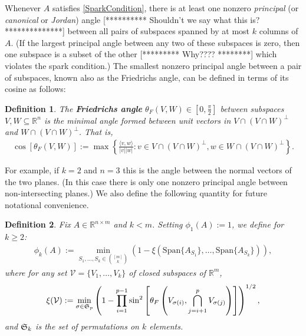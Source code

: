 \documentclass[journal, onecolumn]{IEEEtran}
\newtheorem{definition}{Definition}
\begin{document}
Whenever $A$ satisfies \eqref{SparkCondition}, there is at least one nonzero \textit{principal} (or \textit{canonical} or \textit{Jordan}) angle [********** Shouldn't we say what this is? **************] between all pairs of subspaces spanned by at most $k$ columns of $A$. (If the largest principal angle between any two of these subspaces is zero, then one subspace is a subset of the other [*********  Why???? ********] which violates the spark condition.) The smallest nonzero principal angle between a pair of subspaces, known also as the Friedrichs angle, can be defined in terms of its cosine as follows:

\begin{definition}\label{FriedrichsDefinition}
The \textbf{Friedrichs angle} $\theta_F(V,W) \in [0,\frac{\pi}{2}]$ between subspaces $V,W \subseteq \mathbb{R}^n$ is the minimal angle formed between unit vectors in $V \cap (V \cap W)^\perp$ and $W \cap (V \cap W)^\perp$. That is,
\begin{align}
\cos\left[\theta_F(V,W)\right] := \max\left\{ \frac{ \langle v, w \rangle }{|v||w|}: v \in V \cap (V \cap W)^\perp, w \in W \cap (V \cap W)^\perp \right\}.
\end{align}
\end{definition}

For example, if $k=2$ and $n=3$ this is the angle between the normal vectors of the two planes. (In this case there is only one nonzero principal angle between non-intersecting planes.) We also define the following quantity for future notational convenience.

\begin{definition}\label{SpecialSupportSet}
Fix $A \in \mathbb{R}^{n \times m}$ and $k < m$. Setting $\phi_1(A) := 1$, we define for $k \geq 2$:
\begin{align}\label{rho}
\phi_k(A) := \min_{ S_1,\ldots,S_k \in {[m] \choose k} } \left(1 - \xi( \text{Span}\{A_{S_1}\}, \ldots,  \text{Span}\{A_{S_k}\}) \right),
\end{align}
where for any set $\mathcal{V} = \{V_1, \ldots, V_k\}$ of closed subspaces of $\mathbb{R}^m$, 
\begin{align}
\xi(\mathcal{V}) := \min_{\sigma \in \frak{S}_p} \left(1 - \prod_{i=1}^{p-1} \sin^2\left[ \theta_F \left(V_{\sigma(i)}, \bigcap_{j=i+1}^p V_{\sigma(j)}\right) \right]  \right)^{1/2},
\end{align}
%
and $\frak{S}_k$ is the set of permutations on $k$ elements. 
\end{definition}
\end{document}
